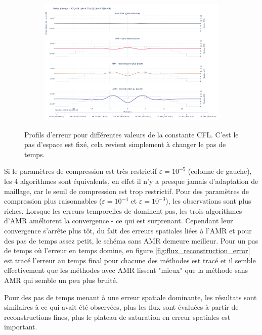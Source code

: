 \begin{figure}[p]
{\begin{minipage}{\textheight}
\begin{subfigure}{0.32\textwidth}
    \includegraphics[width=\linewidth]{media/4_travail/3/03_error_profile_small_cfl.png}
\end{subfigure}

\caption{Profils d'erreur pour différentes valeurs de la constante CFL. C'est le pas d'espace est fixé, 
cela revient simplement à changer le pas de temps.}
\label{fig:error_profiles_landscape}
\end{minipage}%
}
\end{figure}
\clearpage


    
    Si le paramètres de compression est très restrictif $\varepsilon = 10^{-5}$ (colonne de gauche), les 4 algorithmes sont équivalents, en effet il n'y a presque jamais d'adaptation de maillage, car le seuil de compression est trop restrictif.
    Pour des paramètres de compression plus raisonnables ($\varepsilon = 10^{-4}$ et $\varepsilon = 10^{-3}$), les observations sont plus riches.
    Lorsque les erreurs temporelles de dominent pas, les trois algorithmes d'AMR améliorent la convergence - ce qui est surprenant. Cependant leur convergence s'arrête plus tôt, du fait des 
    erreurs spatiales liées à l'AMR et pour des pas de temps assez petit, le schéma sans AMR demeure meilleur. Pour un pas de temps où l'erreur en temps domine, 
    en figure \ref{fig:flux_reconstruction_error} est tracé l'erreur au temps final pour chacune des méthodes est tracé et il semble effectivement que les méthodes avec AMR lissent
    "mieux" que la méthode sans AMR qui semble un peu plus bruité. 


    Pour des pas de temps menant à une erreur spatiale dominante, les résultats sont similaires à ce qui avait été observées, plus les flux sont évaluées à partir de reconstructions fines, 
    plus le plateau de saturation en erreur spatiales est important.
